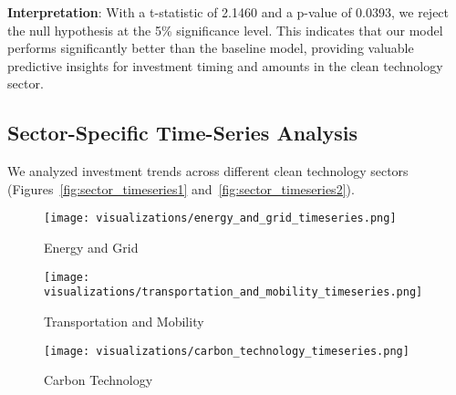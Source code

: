 \documentclass[sigconf]{acmart}
\begin{document}
\textbf{Interpretation}: With a t-statistic of 2.1460 and a p-value of 0.0393, we reject the null hypothesis at the 5\% significance level. This indicates that our model performs significantly better than the baseline model, providing valuable predictive insights for investment timing and amounts in the clean technology sector.

\subsection{Sector-Specific Time-Series Analysis}

We analyzed investment trends across different clean technology sectors (Figures~\ref{fig:sector_timeseries1} and~\ref{fig:sector_timeseries2}).

\begin{figure*}[htpb]
    \centering
    \begin{subfigure}[t]{0.32\textwidth}
        \texttt{[image: visualizations/energy\_and\_grid\_timeseries.png]}
        \caption{Energy and Grid}
    \end{subfigure}
    \hfill
    \begin{subfigure}[t]{0.32\textwidth}
        \texttt{[image: visualizations/transportation\_and\_mobility\_timeseries.png]}
        \caption{Transportation and Mobility}
    \end{subfigure}
    \hfill
    \begin{subfigure}[t]{0.32\textwidth}
        \texttt{[image: visualizations/carbon\_technology\_timeseries.png]}
        \caption{Carbon Technology}
    \end{subfigure}
    \caption{Time-Series of Investment Amounts by Sector (Part 1)}
    \label{fig:sector_timeseries1}
\end{figure*}
\end{document}
